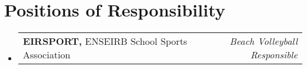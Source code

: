 \documentclass[a4paper,11pt]{article}
\makeatletter
\newcommand{\resumePOR}[3]{
\vspace{0.5mm}\item
    \begin{tabular*}{0.97\textwidth}[t]{l@{\extracolsep{\fill}}r}
        \textbf{#1}\hspace{0.3mm}#2 & \textit{\small{#3}} 
    \end{tabular*}
    \vspace{-2mm}
}
\newcommand{\resumeSubHeadingListStart}{\begin{itemize}[leftmargin=*,labelsep=0mm]}
\newcommand{\resumeSubHeadingListEnd}{\end{itemize}\vspace{2mm}}
\makeatother
\begin{document}
\section{\textbf{Positions of Responsibility}}
\vspace{-0.4mm}
\resumeSubHeadingListStart
\vspace{1.5mm}
\resumePOR{ EIRSPORT, } %
    {ENSEIRB School Sports Association} %
    {Beach Volleyball Responsible} %

\resumeSubHeadingListEnd
\vspace{-4.5mm}





\end{document}
